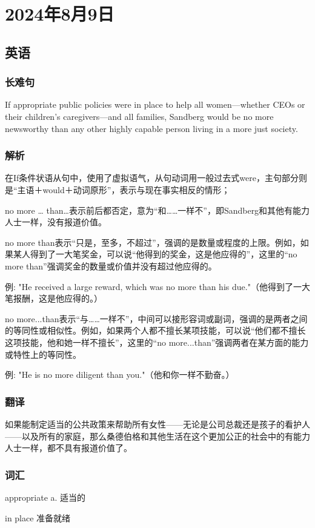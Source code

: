 \documentclass[UTF8]{ctexart}
\begin{document}
\section{2024年8月9日}
\subsection{英语}
\subsubsection{长难句}
If appropriate public policies were in place to help all women---whether CEOs or their children's caregivers---and all families, Sandberg would be no more newsworthy than any other highly capable person living in a more just society.
\subsubsection{解析}
在If条件状语从句中，使用了虚拟语气，从句动词用一般过去式were，主句部分则是“主语＋would＋动词原形”，表示与现在事实相反的情形；

no more … than…表示前后都否定，意为“和……一样不”，即Sandberg和其他有能力人士一样，没有报道价值。

no more than表示“只是，至多，不超过”，强调的是数量或程度的上限。例如，如果某人得到了一大笔奖金，可以说“他得到的奖金，这是他应得的”，这里的“no more than”强调奖金的数量或价值并没有超过他应得的。

例: "He received a large reward, which was no more than his due."（他得到了一大笔报酬，这是他应得的。）

no more...than表示“与……一样不”，中间可以接形容词或副词，强调的是两者之间的等同性或相似性。例如，如果两个人都不擅长某项技能，可以说“他们都不擅长这项技能，他和她一样不擅长”，这里的“no more...than”强调两者在某方面的能力或特性上的等同性。

例: "He is no more diligent than you."（他和你一样不勤奋。）
\subsubsection{翻译}
如果能制定适当的公共政策来帮助所有女性——无论是公司总裁还是孩子的看护人——以及所有的家庭，那么桑德伯格和其他生活在这个更加公正的社会中的有能力人士一样，都不具有报道价值了。
\subsubsection{词汇}
appropriate a. 适当的

in place 准备就绪
\end{document}
